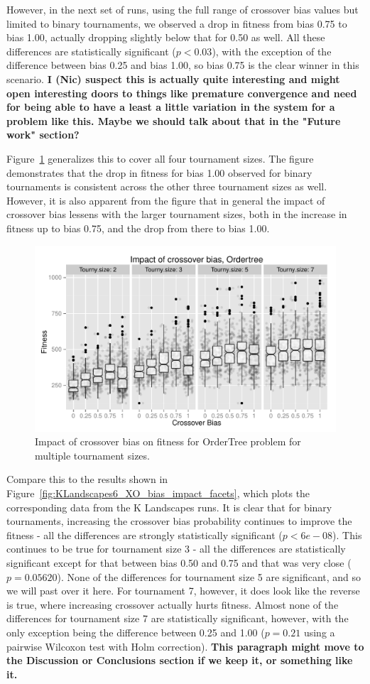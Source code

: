 \documentclass{sig-alternate}
\begin{document}
However, in the next set of runs, using the full range of crossover bias values but limited to binary tournaments, we
observed a drop in fitness from bias 0.75 to bias 1.00, actually dropping slightly below that for 0.50 as well. All
these differences are statistically significant ($p < 0.03$), with the exception of the difference between bias 0.25
and bias 1.00, so bias 0.75 is the clear winner in this scenario. \textbf{I (Nic) suspect this is actually quite
interesting and might open interesting doors to things like premature convergence and need for being able to have a
least a little variation in the system for a problem like this. Maybe we should talk about that in the "Future work"
section?}

Figure~\ref{fig:Ordertree_results_all_tournaments_Jan15} generalizes this to cover all four tournament sizes. The
figure demonstrates that the drop in fitness for bias 1.00 observed for binary tournaments is consistent across the
other three tournament sizes as well. However, it is also apparent from the figure that in general the impact of
crossover bias lessens with the larger tournament sizes, both in the increase in fitness up to bias 0.75, and the drop
from there to bias 1.00.

\begin{figure}
\centering
\includegraphics[width=0.45 \textwidth]{Plots/Ordertree_results_all_tournaments_Jan15.pdf}
\caption{Impact of crossover bias on fitness for OrderTree problem for multiple tournament sizes.}
\label{fig:Ordertree_results_all_tournaments_Jan15}
\end{figure}

Compare this to the results shown in Figure~\ref{fig:KLandscapes6_XO_bias_impact_facets}, which plots the corresponding
data from the K Landscapes runs. It is clear that for binary tournaments, increasing the crossover bias probability
continues to improve the fitness - all the differences are strongly statistically significant ($p<6e-08$). This
continues to be true for tournament size 3 - all the differences are statistically significant except for that between
bias 0.50 and 0.75 and that was very close ($p=0.05620$). None of the differences for tournament size 5 are
significant, and so we will past over it here. For tournament 7, however, it does look like the reverse is true, where
increasing crossover actually hurts fitness. Almost none of the differences for tournament size 7 are statistically
significant, however, with the only exception being the difference between 0.25 and 1.00 ($p=0.21$ using a pairwise
Wilcoxon test with Holm correction). \textbf{This paragraph might move to the Discussion or Conclusions section if we
keep it, or something like it.}
\end{document}
